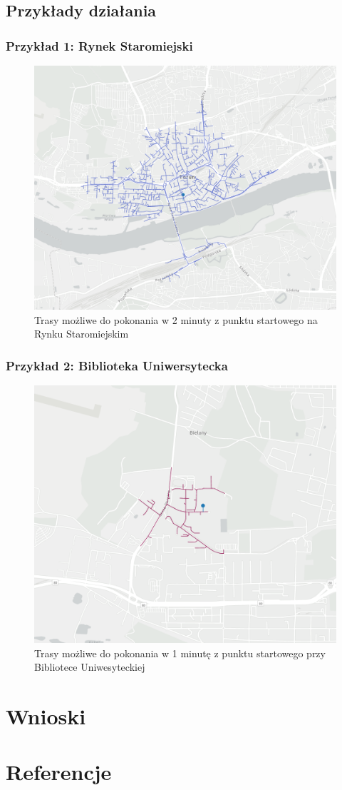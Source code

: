 \documentclass{article}
\begin{document}
\subsection{Przykłady działania}
\subsubsection{Przykład 1: Rynek Staromiejski}
\begin{figure}[H]
    \centering
    \includegraphics[width=1\textwidth]{img/rynek-2-min.png}
    \caption{Trasy możliwe do pokonania w 2 minuty z punktu startowego na Rynku Staromiejskim}
\end{figure}

\subsubsection{Przykład 2: Biblioteka Uniwersytecka}
\begin{figure}[H]
    \centering
    \includegraphics[width=1\textwidth]{img/umk-1-min.png}
    \caption{Trasy możliwe do pokonania w 1 minutę z punktu startowego przy Bibliotece Uniwesyteckiej}
\end{figure}

\section{Wnioski}
\section{Referencje}
\end{document}
